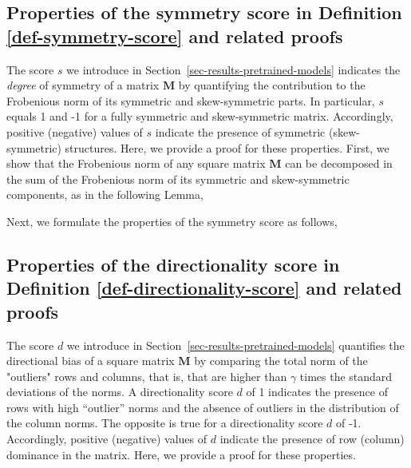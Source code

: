 \subsection{Properties of the symmetry score in Definition \ref{def-symmetry-score} and related proofs}
\label{supp-math-symmetry-score}
%
The score $s$ we introduce in Section~\ref{sec-results-pretrained-models} indicates the \emph{degree} of symmetry of a matrix $\bm{M}$ by quantifying the contribution to the Frobenious norm of its symmetric and skew-symmetric parts. 
%
In particular, $s$ equals 1 and -1 for a fully symmetric and skew-symmetric matrix.
%
Accordingly, positive (negative) values of $s$ indicate the presence of symmetric (skew-symmetric) structures.
%
Here, we provide a proof for these properties. 
%
First, we show that the Frobenious norm of any square matrix $\bm{M}$ can be decomposed in the sum of the Frobenious norm of its symmetric and skew-symmetric components, as in the following Lemma,
%


%
Next, we formulate the properties of the symmetry score as follows,
%


%



\subsection{Properties of the directionality score in Definition \ref{def-directionality-score} and related proofs}
\label{supp-math-directionality-score}
%
The score $d$ we introduce in Section~\ref{sec-results-pretrained-models} quantifies the directional bias of a square matrix $\bm{M}$ by comparing the total norm of the "outliers" rows and columns, that is, that are higher than $\gamma$ times the standard deviations of the norms.
%
A directionality score $d$ of 1 indicates the presence of rows with high ``outlier'' norms and the absence of outliers in the distribution of the column norms.  
%
The opposite is true for a directionality score $d$ of -1.
%
Accordingly, positive (negative) values of $d$ indicate the presence of row (column) dominance in the matrix.
%
Here, we provide a proof for these properties.
%

